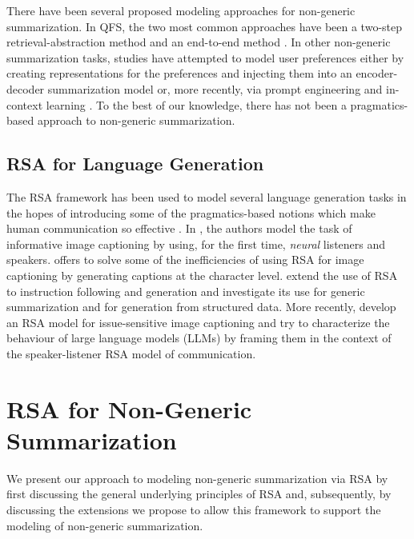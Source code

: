\documentclass[11pt]{article}
\begin{document}
There have been several proposed modeling approaches for non-generic summarization. In QFS, the two most common approaches have been a two-step retrieval-abstraction method and an end-to-end method \citep{vigExploringNeuralModels2022}. In other non-generic summarization tasks, studies have attempted to model user preferences either by creating representations for the preferences and injecting them into an encoder-decoder summarization model \citep{fanControllableAbstractiveSummarization2018,aoPENSDatasetGeneric2021} or, more recently, via prompt engineering and in-context learning \citep{shaibSummarizingSimplifyingSynthesizing2023a,yangExploringLimitsChatGPT2023}. To the best of our knowledge, there has not been a pragmatics-based approach to non-generic summarization.

\subsection{RSA for Language Generation}

The RSA framework has been used to model several language generation tasks in the hopes of introducing some of the pragmatics-based notions which make human communication so effective \citep{grice1975logic}. In \citet{andreasReasoningPragmaticsNeural2016}, the authors model the task of informative image captioning by using, for the first time, \emph{neural} listeners and speakers. \citet{cohn-gordonPragmaticallyInformativeImage2018a} offers to solve some of the inefficiencies of using RSA for image captioning by generating captions at the character level. \citet{friedUnifiedPragmaticModels2018} extend the use of RSA to instruction following and generation and \citet{see-etal-2017-get} investigate its use for generic summarization and for generation from structured data. More recently, \citet{Nie2020PragmaticII} develop an RSA model for issue-sensitive image captioning and \citet{Nguyen2023LanguageMA} try to characterize the behaviour of large language models (LLMs) by framing them in the context of the speaker-listener RSA model of communication. 

\section{RSA for Non-Generic Summarization}

\label{sec:rsa_for_nongen_summ}

We present our approach to modeling non-generic summarization via RSA by first discussing the general underlying principles of RSA and, subsequently, by discussing the extensions we propose to allow this framework to support the modeling of non-generic summarization.
\end{document}
